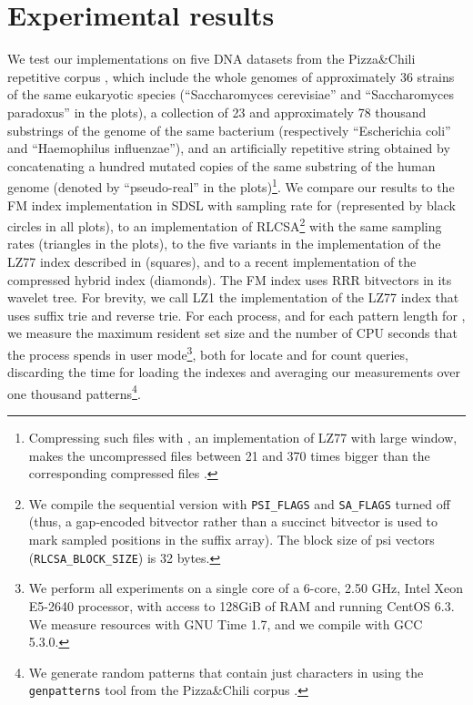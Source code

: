 \documentclass[a4paper,UKenglish]{lipics-v2016}
\begin{document}
\section{Experimental results} \label{sec:experiments}

We test our implementations on five DNA datasets from the Pizza\&Chili repetitive corpus \cite{pizzachili}, which include the whole genomes of approximately 36 strains of the same eukaryotic species (``Saccharomyces cerevisiae'' and ``Saccharomyces paradoxus'' in the plots), a collection of 23 and approximately 78 thousand substrings of the genome of the same bacterium (respectively ``Escherichia coli'' and ``Haemophilus influenzae''), and an artificially repetitive string obtained by concatenating a hundred mutated copies of the same substring of the human genome (denoted by ``pseudo-real'' in the plots)\footnote{Compressing such files with  \cite{p7zip}, an implementation of LZ77 with large window, makes the uncompressed files between 21 and 370 times bigger than the corresponding compressed files \cite{pizzachili}.}. We compare our results to the FM index implementation in SDSL \cite{gbmp2014sea} with sampling rate  for  (represented by black circles in all plots), to an implementation of RLCSA\footnote{We compile the sequential version with \texttt{PSI\_FLAGS} and \texttt{SA\_FLAGS} turned off (thus, a gap-encoded bitvector rather than a succinct bitvector is used to mark sampled positions in the suffix array). The block size of psi vectors (\texttt{RLCSA\_BLOCK\_SIZE}) is 32 bytes.} \cite{adamnovak} with the same sampling rates (triangles in the plots), to the five variants in the implementation of the LZ77 index described in \cite{kreft2010self} (squares), and to a recent implementation of the compressed hybrid index \cite{valenzuela2016chico} (diamonds). The FM index uses RRR bitvectors in its wavelet tree. For brevity, we call LZ1 the implementation of the LZ77 index that uses suffix trie and reverse trie. For each process, and for each pattern length  for , we measure the maximum resident set size and the number of CPU seconds that the process spends in user mode\footnote{We perform all experiments on a single core of a 6-core, 2.50 GHz, Intel Xeon E5-2640 processor, with access to 128GiB of RAM and running CentOS 6.3. We measure resources with GNU Time 1.7, and we compile with GCC 5.3.0.}, both for locate and for count queries, discarding the time for loading the indexes and averaging our measurements over one thousand patterns\footnote{We generate random patterns that contain just characters in  using the \texttt{genpatterns} tool from the Pizza\&Chili corpus \cite{pizzachili}.}.
\end{document}
